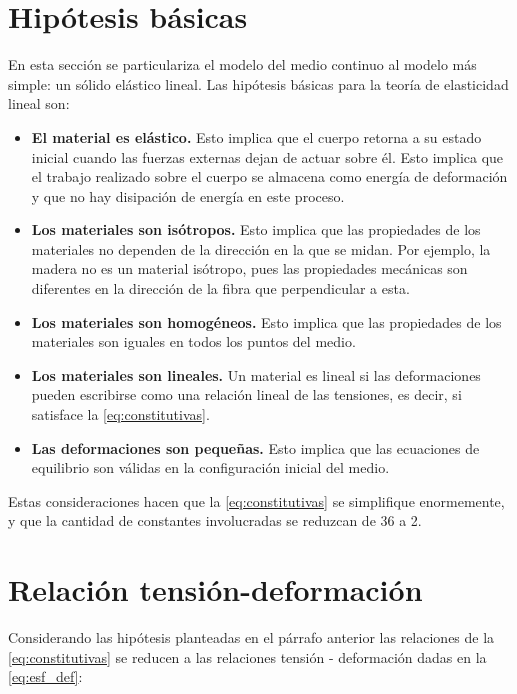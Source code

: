 \documentclass[../notas medios.tex]{subfiles}
\begin{document}
\section{Hipótesis básicas}
En esta sección se particulariza el modelo del medio continuo al modelo más simple: un sólido elástico lineal. Las hipótesis básicas para la teoría de elasticidad lineal son:
\begin{itemize}
\item \textbf{El material es elástico.} Esto implica que el cuerpo retorna a su estado inicial cuando las fuerzas externas dejan de actuar sobre él. Esto implica que el trabajo realizado sobre el cuerpo se almacena como energía de deformación y que no hay disipación de energía en este proceso.

\item \textbf{Los materiales son isótropos.} Esto implica que las propiedades de los materiales no dependen de la dirección en la que se midan. Por ejemplo, la madera no es un material isótropo, pues las propiedades mecánicas son diferentes en la dirección de la fibra que perpendicular a esta.

\item \textbf{Los materiales son homogéneos.} Esto implica que las propiedades de los materiales son iguales en todos los puntos del medio.

\item \textbf{Los materiales son lineales.} Un material es lineal si las 
deformaciones pueden escribirse como una relación lineal de las tensiones, es 
decir, si satisface la \cref{eq:constitutivas}.

\item \textbf{Las deformaciones son pequeñas.} Esto implica que las ecuaciones de equilibrio son válidas en la configuración inicial del medio.

\end{itemize}

Estas consideraciones hacen que la \cref{eq:constitutivas} se simplifique 
enormemente, y que la cantidad de constantes involucradas se reduzcan de 36 a 2.

\section{Relación tensión-deformación}
Considerando las hipótesis planteadas en el párrafo anterior las relaciones de 
la  \cref{eq:constitutivas} se reducen a las relaciones tensión - deformación 
dadas en la  \cref{eq:esf_def}:
\end{document}
